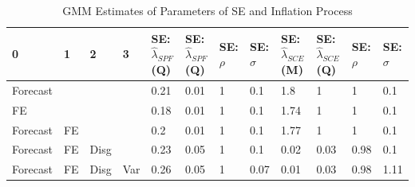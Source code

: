 \documentclass[]{article}
\begin{document}
	\begin{table}
	\caption{GMM Estimates of Parameters of SE and Inflation Process}
	\label{GMM_Est_SE_Table}
\begin{tabular}{llllllllllll}
	\hline 
	0        & 1  & 2    & 3   & SE: $\hat\lambda_{SPF}$(Q) & SE: $\hat\lambda_{SPF}$(Q) & SE: $\rho$ & SE: $\sigma$ & SE: $\hat\lambda_{SCE}$(M) & SE: $\hat\lambda_{SCE}$(Q) & SE: $\rho$ & SE: $\sigma$ \\
	\hline 
	Forecast &    &      &     & 0.21                       & 0.01                       & 1          & 0.1          & 1.8                        & 1                          & 1          & 0.1          \\
		\hline 
	FE       &    &      &     & 0.18                       & 0.01                       & 1          & 0.1          & 1.74                       & 1                          & 1          & 0.1          \\
		\hline 
	Forecast & FE &      &     & 0.2                        & 0.01                       & 1          & 0.1          & 1.77                       & 1                          & 1          & 0.1          \\
		\hline 
	Forecast & FE & Disg &     & 0.23                       & 0.05                       & 1          & 0.1          & 0.02                       & 0.03                       & 0.98       & 0.1          \\
		\hline 
	Forecast & FE & Disg & Var & 0.26                       & 0.05                       & 1          & 0.07         & 0.01                       & 0.03                       & 0.98       & 1.11         \\
		\hline 
\end{tabular}
\end{table}
\end{document}
